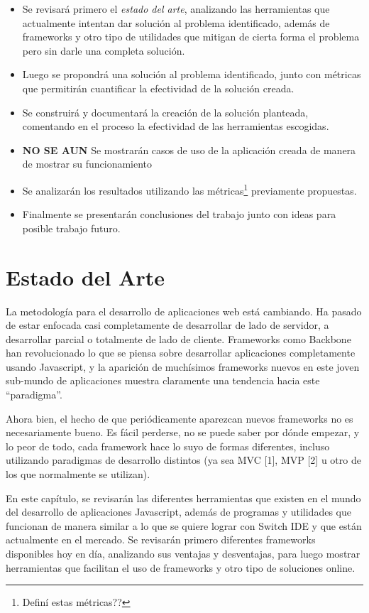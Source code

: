 \documentclass[12pt,titlepage,]{article}
\begin{document}
\begin{itemize}
\item
  Se revisará primero el \emph{estado del arte}, analizando las
  herramientas que actualmente intentan dar solución al problema
  identificado, además de frameworks y otro tipo de utilidades que
  mitigan de cierta forma el problema pero sin darle una completa
  solución.
\item
  Luego se propondrá una solución al problema identificado, junto con
  métricas que permitirán cuantificar la efectividad de la solución
  creada.
\item
  Se construirá y documentará la creación de la solución planteada,
  comentando en el proceso la efectividad de las herramientas escogidas.
\item
  \textbf{NO SE AUN} Se mostrarán casos de uso de la aplicación creada
  de manera de mostrar su funcionamiento
\item
  Se analizarán los resultados utilizando las métricas\footnote{Definí
    estas métricas??} previamente propuestas.
\item
  Finalmente se presentarán conclusiones del trabajo junto con ideas
  para posible trabajo futuro.
\end{itemize}

\clearpage
\newpage

\section{Estado del Arte}

\label{section:state-of-the-art}

La metodología para el desarrollo de aplicaciones web está cambiando. Ha
pasado de estar enfocada casi completamente de desarrollar de lado de
servidor, a desarrollar parcial o totalmente de lado de cliente.
Frameworks como Backbone han revolucionado lo que se piensa sobre
desarrollar aplicaciones completamente usando Javascript, y la aparición
de muchísimos frameworks nuevos en este joven sub-mundo de aplicaciones
muestra claramente una tendencia hacia este ``paradigma''.

Ahora bien, el hecho de que periódicamente aparezcan nuevos frameworks
no es necesariamente bueno. Es fácil perderse, no se puede saber por
dónde empezar, y lo peor de todo, cada framework hace lo suyo de formas
diferentes, incluso utilizando paradigmas de desarrollo distintos (ya
sea MVC {[}1{]}, MVP {[}2{]} u otro de los que normalmente se utilizan).

En este capítulo, se revisarán las diferentes herramientas que existen
en el mundo del desarrollo de aplicaciones Javascript, además de
programas y utilidades que funcionan de manera similar a lo que se
quiere lograr con Switch IDE y que están actualmente en el mercado. Se
revisarán primero diferentes frameworks disponibles hoy en día,
analizando sus ventajas y desventajas, para luego mostrar herramientas
que facilitan el uso de frameworks y otro tipo de soluciones online.
\end{document}
